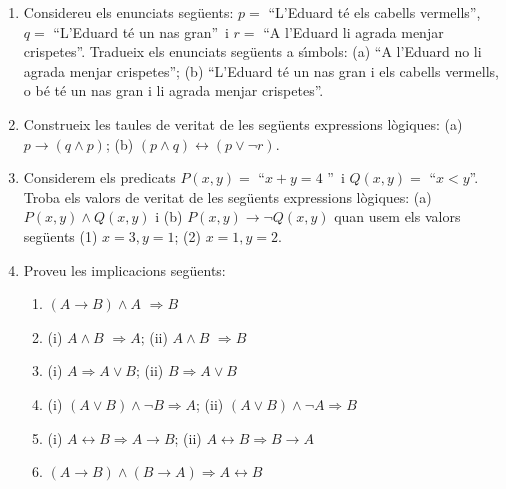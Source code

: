 \begin{enumerate}
\item Considereu els enunciats seg\"{u}ents: $p=$ \textquotedblleft L'Eduard
t\'{e} els cabells vermells\textquotedblright, $q=$ \textquotedblleft L'Eduard
t\'{e} un nas gran\textquotedblright\ i $r=$ \textquotedblleft A l'Eduard li
agrada menjar crispetes\textquotedblright. Tradueix els enunciats seg\"{u}ents
a s\'{\i}mbols: (a) \textquotedblleft A l'Eduard no li agrada menjar
crispetes\textquotedblright; (b) \textquotedblleft L'Eduard t\'{e} un nas gran
i els cabells vermells, o b\'{e} t\'{e} un nas gran i li agrada menjar
crispetes\textquotedblright.

\item Construeix les taules de veritat de les seg\"{u}ents expressions
l\`{o}giques: (a) $p\longrightarrow(q\wedge p)$; (b) $(p\wedge
q)\longleftrightarrow(p\vee\lnot r)$.

\item Considerem els predicats $P(x,y)=$ \textquotedblleft$x+y=4$%
\textquotedblright\ i $Q(x,y)=$ \textquotedblleft$x<y$\textquotedblright.
Troba els valors de veritat de les seg\"{u}ents expressions l\`{o}giques: (a)
$P(x,y)\wedge Q(x,y)$ i (b) $P(x,y)\longrightarrow\lnot Q(x,y)$ quan usem els
valors seg\"{u}ents (1) $x=3,y=1$; (2) $x=1,y=2$.

\item Proveu les implicacions seg\"{u}ents:

\begin{enumerate}
\item $(A\longrightarrow B)\wedge A$ $\Longrightarrow B$

\item (i) $A\wedge B$ $\Longrightarrow A$; (ii) $A\wedge B$ $\Longrightarrow
B$

\item (i) $A\Longrightarrow A\vee B$; (ii) $B\Longrightarrow A\vee B$

\item (i) $\left(  A\vee B\right)  \wedge\lnot B\Longrightarrow A$; (ii)
$\left(  A\vee B\right)  \wedge\lnot A\Longrightarrow B$

\item (i) $A\longleftrightarrow B\Longrightarrow A\longrightarrow B$; (ii)
$A\longleftrightarrow B\Longrightarrow B\longrightarrow A$

\item $\left(  A\longrightarrow B\right)  \wedge\left(  B\longrightarrow
A\right)  \Longrightarrow A\longleftrightarrow B$
\end{enumerate}


\end{enumerate}
